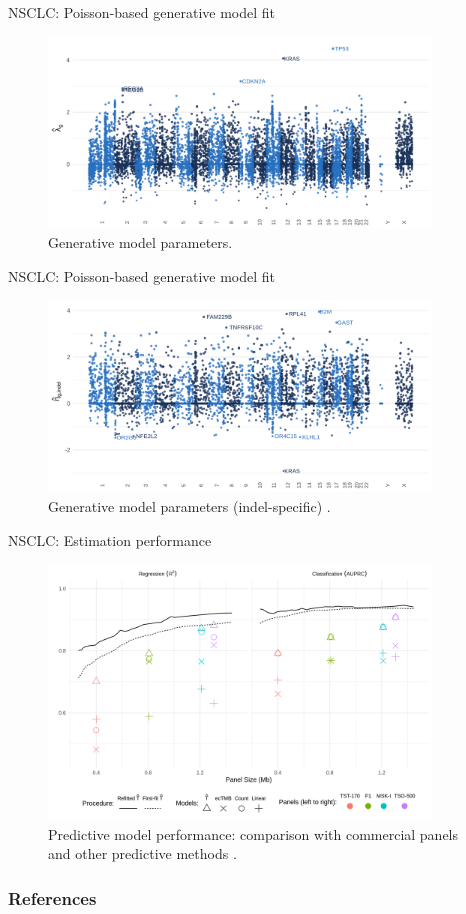 \documentclass{beamer}
\begin{document}
\begin{frame}{NSCLC: Poisson-based generative model fit}

\begin{figure}[htbp]
\centering
\includegraphics[width=4in]{figures/fig4.png}
\caption{Generative model parameters. \citep{bradley_data-driven_2021}\label{fig:3}}
\end{figure}
\end{frame}

\begin{frame}{NSCLC: Poisson-based generative model fit}

\begin{figure}[htbp]
\centering
\includegraphics[width=4in]{figures/fig5.png}
\caption{Generative model parameters (indel-specific) \citep{bradley_data-driven_2021}. \label{fig:3}}
\end{figure}
    
\end{frame}

\begin{frame}{NSCLC: Estimation performance}

\begin{figure}[htbp]
\centering
\includegraphics[width=4in]{fig7.png}
\caption{Predictive model performance: comparison with commercial panels and other predictive methods \citep{bradley_data-driven_2021, yao_ectmb_2020}. \label{fig:7}}
\end{figure}
\end{frame}

\begin{frame}[allowframebreaks]
        \frametitle{References}
        
\end{frame}
\end{document}
